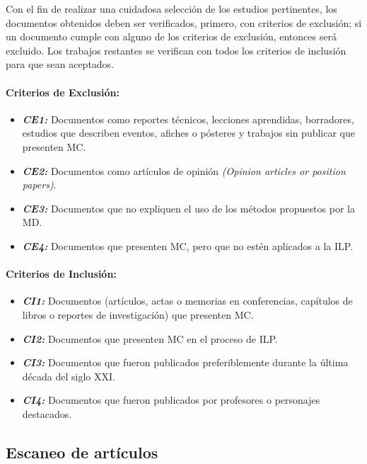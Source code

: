 Con el fin de realizar una cuidadosa selección de los estudios pertinentes, los documentos obtenidos deben ser verificados, primero, con criterios de exclusión; si un documento cumple con alguno de los criterios de exclusión, entonces será excluido. Los trabajos restantes se verifican con todos los criterios de inclusión para que sean aceptados.


\paragraph {Criterios de Exclusión:}
\begin{itemize}
\item \textbf{\textit{CE1: }} Documentos como reportes técnicos, lecciones aprendidas, borradores, estudios que describen eventos, afiches o pósteres y trabajos sin publicar que presenten MC.
\item \textbf{\textit{CE2: }} Documentos como artículos de opinión \textit{(Opinion articles or position papers)}.
\item \textbf{\textit{CE3: }} Documentos que no expliquen el uso de los métodos propuestos por la MD.
\item \textbf{\textit{CE4: }} Documentos que presenten MC, pero que no estén aplicados a la ILP.
\end{itemize}

\paragraph {Criterios de Inclusión:}
\begin{itemize}
	\item \textbf{\textit{CI1: }} Documentos (artículos, actas o memorias en conferencias, capítulos de libros o reportes de investigación) que presenten MC.
	\item \textbf{\textit{CI2: }} Documentos que presenten MC en el proceso de ILP.
	\item \textbf{\textit{CI3: }} Documentos que fueron publicados preferiblemente durante la última década del siglo XXI. %
	\item \textbf{\textit{CI4: }} Documentos que fueron publicados por profesores o personajes destacados.
\end{itemize}

\subsection{Escaneo de artículos}

